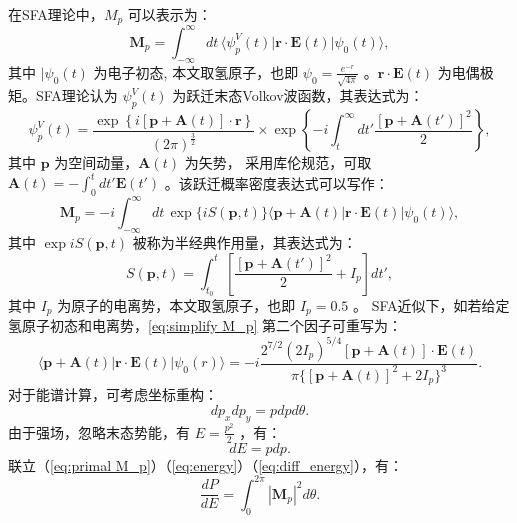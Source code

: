 在SFA理论中，$M_p$ 可以表示为：
\begin{equation}
\mathbf M_p = \int_{-\infty}^{\infty} dt \, \langle \psi^V_p(t) | \mathbf{r} \cdot \mathbf{E}(t) | \psi_0(t) \rangle, \label{eq:primal M_p}
\end{equation}
其中 $|\psi_0(t)$ 为电子初态, 本文取氢原子，也即 $\psi_0 = \frac{e^{-r}}{\sqrt{4\pi}}$ 。$\mathbf{r} \cdot \mathbf{E}(t)$ 为电偶极矩。SFA理论认为 $\psi^V_p(t)$ 为跃迁末态Volkov波函数，其表达式为：
\begin{equation}
\psi^V_p(t) = \frac{\exp\left\{ i\left[\mathbf{p} + \mathbf{A}(t)\right] \cdot \mathbf{r} \right\}}{(2\pi)^{\frac{3}{2}}} \times \exp\left\{ -i \int_{t}^{\infty} dt' \frac{\left[\mathbf{p} + \mathbf{A}(t')\right]^2}{2} \right\}, \label{eq:volkov state}
\end{equation}
其中 $\mathbf{p}$ 为空间动量，$\mathbf{A}(t)$ 为矢势， 采用库伦规范，可取 $\mathbf{A}(t) = -\int_{0}^{t} dt' \mathbf{E}(t')$ 。该跃迁概率密度表达式可以写作：
\begin{equation}
\mathbf M_p = - i\int_{-\infty}^{\infty} dt\, \exp{\{iS(\mathbf{p}, t)\}} \langle \mathbf{p} + \mathbf{A}(t) | \mathbf{r} \cdot \mathbf{E}(t) | \psi_0(t) \rangle, \label{eq:simplify M_p}
\end{equation}
其中 $\exp{iS(\mathbf{p}, t)}$ 被称为半经典作用量，其表达式为：
\begin{equation}
S(\mathbf{p}, t) = \int_{t_0}^t \left[ \frac{\left[\mathbf{p} + \mathbf{A}(t')\right]^2}{2} + I_p \right] dt', \label{eq:semi action}
\end{equation}
其中 $I_p$ 为原子的电离势，本文取氢原子，也即 $I_p = 0.5$ 。
SFA近似下，如若给定氢原子初态和电离势，\eqref{eq:simplify M_p} 第二个因子可重写为：
\begin{equation}
\langle \mathbf{p} + \mathbf{A}(t) | \mathbf{r} \cdot \mathbf{E}(t) | \psi_0(r) \rangle = -i \frac{2^{7/2} (2I_p)^{5/4} [\mathbf{p} + \mathbf{A}(t)] \cdot \mathbf{E}(t)}{\pi \{ [\mathbf{p} + \mathbf{A}(t)]^2 + 2I_p \}^3}. \label{eq:rewrite M_p 2}
\end{equation}
对于能谱计算，可考虑坐标重构：
\begin{equation}
	dp_xdp_y = pdp d\theta.
	\label{eq:energy}
\end{equation}
由于强场，忽略末态势能，有 $E = \frac{p^2}{2}$ ，有：
\begin{equation}
	dE = p dp.
	\label{eq:diff_energy}
\end{equation}
联立（\ref{eq:primal M_p}）（\ref{eq:energy}）（\ref{eq:diff_energy}），有：
\begin{equation}
	\frac{dP}{dE} = \int_{0}^{2\pi} |\mathbf{M}_p|^2 d\theta.
\end{equation}


